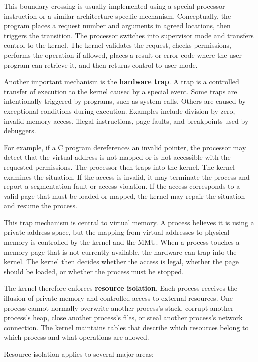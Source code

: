 \documentclass[a4paper,twoside]{report}
\begin{document}
This boundary crossing is usually implemented using a special processor instruction or a similar architecture-specific mechanism. Conceptually, the program places a request number and arguments in agreed locations, then triggers the transition. The processor switches into supervisor mode and transfers control to the kernel. The kernel validates the request, checks permissions, performs the operation if allowed, places a result or error code where the user program can retrieve it, and then returns control to user mode.

Another important mechanism is the \textbf{hardware trap}. A trap is a controlled transfer of execution to the kernel caused by a special event. Some traps are intentionally triggered by programs, such as system calls. Others are caused by exceptional conditions during execution. Examples include division by zero, invalid memory access, illegal instructions, page faults, and breakpoints used by debuggers.

For example, if a C program dereferences an invalid pointer, the processor may detect that the virtual address is not mapped or is not accessible with the requested permissions. The processor then traps into the kernel. The kernel examines the situation. If the access is invalid, it may terminate the process and report a segmentation fault or access violation. If the access corresponds to a valid page that must be loaded or mapped, the kernel may repair the situation and resume the process.

This trap mechanism is central to virtual memory. A process believes it is using a private address space, but the mapping from virtual addresses to physical memory is controlled by the kernel and the MMU. When a process touches a memory page that is not currently available, the hardware can trap into the kernel. The kernel then decides whether the access is legal, whether the page should be loaded, or whether the process must be stopped.

The kernel therefore enforces \textbf{resource isolation}. Each process receives the illusion of private memory and controlled access to external resources. One process cannot normally overwrite another process's stack, corrupt another process's heap, close another process's files, or steal another process's network connection. The kernel maintains tables that describe which resources belong to which process and what operations are allowed.

Resource isolation applies to several major areas:
\end{document}
